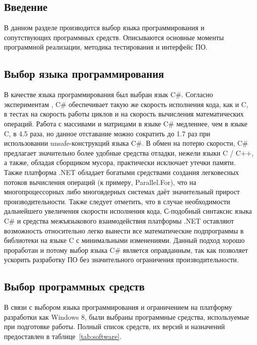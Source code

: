 \subsection{Введение}
В данном разделе производится выбор языка программирования и сопутствующих 
программных средств. Описываются основные моменты программной реализации, 
методика тестирования и интерфейс ПО.

\subsection{Выбор языка программирования}
В качестве языка программирования был выбран язык C\#. Согласно экспериментам 
\cite{csharp_speed_comparison}, C\# обеспечивает такую же скорость исполнения 
кода, как и C, в тестах на скорость работы циклов и на скорость вычисления 
математических операций. Работа с массивами и матрицами в языке C\# медленнее, 
чем в языке C, в 4.5 раза, но данное отставание можно сократить до 1.7 раз при 
использовании unsafe-конструкций языка C\#. В обмен на потерю скорости, C\# 
предлагает значительно более удобные средства отладки, нежели языки C / C++, а 
также, обладая сборщиком мусора, практически исключает утечки памяти. Также 
платформа .NET обладает богатыми средствами создания легковесных потоков 
вычисления операций (к примеру, Parallel.For\cite{csharp_msdn_parallel}), что 
на многопроцессорных либо многоядерных системах даёт значительный прирост 
производительности. Также следует отметить, что в случае необходимости 
дальнейшего увеличения скорости исполнения кода, С-подобный синтаксис языка C\# 
и средства межъязыкового взаимодействия платформы .NET оставляют возможность 
относительно легко вынести все математические подпрограммы в библиотеки на 
языке C с минимальными изменениями. Данный подход хорошо 
проработан\cite{csharp_interop_A, csharp_interop_B} и потому выбор языка C\# 
является оправданным, так как позволяет ускорить разработку ПО без 
значительного ограничения производительности.

\subsection{Выбор программных средств}
В связи с выбором языка программирования и ограничением на платформу разработки 
как Windows 8, были выбраны программные средства, используемые при подготовке 
работы. Полный список средств, их версий и назначений предоставлен в 
таблице~\ref{tab:software}.

